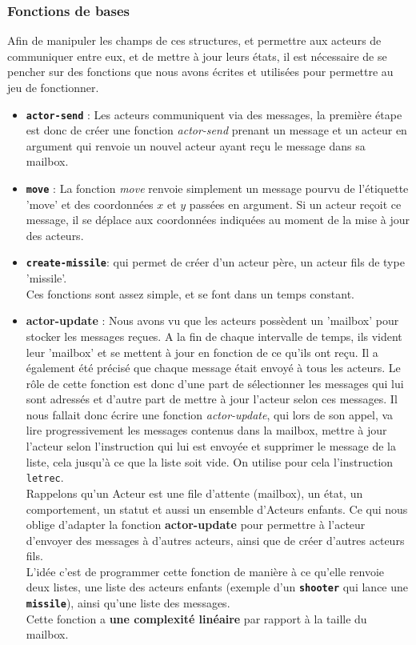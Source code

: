 \documentclass[a4paper,10pt]{article}
\begin{document}
\subsubsection{Fonctions de bases}
\label{base}
Afin de manipuler les champs de ces structures, et permettre aux acteurs de communiquer entre eux, et de mettre à jour leurs états, il est nécessaire de se pencher sur des fonctions que nous avons écrites et utilisées pour permettre au jeu de fonctionner.
\begin{itemize}
\item \textbf{\texttt{actor-send}} : Les acteurs communiquent via des messages, la première étape est donc de créer une fonction \emph{actor-send} prenant un message et un acteur en argument qui renvoie un nouvel acteur ayant reçu le message dans sa mailbox.\\
\item \textbf{\texttt{move}} : La fonction \emph{move} renvoie simplement un message pourvu de l'étiquette 'move' et des coordonnées $x$ et $y$ passées en argument. Si un acteur reçoit ce message, il se déplace aux coordonnées indiquées au moment de la mise à jour des acteurs. \\
\item \textbf{\texttt{create-missile}}: qui permet de créer d'un acteur père, un acteur fils de type 'missile'.\\
Ces fonctions sont assez simple, et se font dans un temps constant.\\ 
\item \textbf{actor-update} : Nous avons vu que les acteurs possèdent un 'mailbox' pour stocker les messages reçues. A la fin de chaque intervalle de temps, ils vident leur 'mailbox' et se mettent à jour en fonction de ce qu'ils ont reçu. Il a également été précisé que chaque message était envoyé à tous les acteurs. Le rôle de cette fonction est donc d'une part de sélectionner les messages qui lui sont adressés et d'autre part de mettre à jour l'acteur selon ces messages. Il nous fallait donc écrire une fonction \emph{actor-update}, qui lors de son appel, va lire progressivement les messages contenus dans la mailbox, mettre à jour l'acteur selon l'instruction qui lui est envoyée et supprimer le message de la liste, cela jusqu'à ce que la liste soit vide. On utilise pour cela l'instruction \texttt{letrec}.\\
Rappelons qu'un Acteur est une file d’attente (mailbox), un état, un comportement, un statut et aussi un ensemble d’Acteurs enfants. Ce qui nous oblige d'adapter la fonction \textbf{actor-update} pour permettre à l'acteur d'envoyer des messages à d'autres acteurs, ainsi que de créer d'autres acteurs fils.\\
L'idée c'est de programmer cette fonction  de manière à ce qu'elle renvoie deux listes, une liste des acteurs enfants (exemple d'un \textbf{\texttt{shooter}} qui lance une \textbf{\texttt{missile}}), ainsi qu'une liste des messages.\\
Cette fonction a \textbf{une complexité linéaire} par rapport à la taille du mailbox.
\end{itemize}
\end{document}
